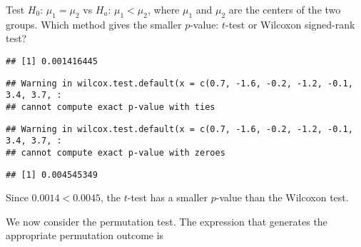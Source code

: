 \documentclass[
]{book}
\newenvironment{Shaded}{\begin{snugshade}}{\end{snugshade}}
\newcommand{\CommentTok}[1]{\textcolor[rgb]{0.56,0.35,0.01}{\textit{#1}}}
\newcommand{\DataTypeTok}[1]{\textcolor[rgb]{0.13,0.29,0.53}{#1}}
\newcommand{\KeywordTok}[1]{\textcolor[rgb]{0.13,0.29,0.53}{\textbf{#1}}}
\newcommand{\NormalTok}[1]{#1}
\newcommand{\OperatorTok}[1]{\textcolor[rgb]{0.81,0.36,0.00}{\textbf{#1}}}
\newcommand{\OtherTok}[1]{\textcolor[rgb]{0.56,0.35,0.01}{#1}}
\newcommand{\StringTok}[1]{\textcolor[rgb]{0.31,0.60,0.02}{#1}}
\begin{document}
Test \(H_0\): \(\mu_1 = \mu_2\) vs \(H_a\): \(\mu_1 < \mu_2\),
where \(\mu_1\) and \(\mu_2\) are the centers of the two groups.
Which method gives the smaller \(p\)-value:
\(t\)-test or Wilcoxon signed-rank test?

\begin{Shaded}
\end{Shaded}

\begin{verbatim}
## [1] 0.001416445
\end{verbatim}

\begin{Shaded}
\end{Shaded}

\begin{verbatim}
## Warning in wilcox.test.default(x = c(0.7, -1.6, -0.2, -1.2, -0.1, 3.4, 3.7, :
## cannot compute exact p-value with ties
\end{verbatim}

\begin{verbatim}
## Warning in wilcox.test.default(x = c(0.7, -1.6, -0.2, -1.2, -0.1, 3.4, 3.7, :
## cannot compute exact p-value with zeroes
\end{verbatim}

\begin{verbatim}
## [1] 0.004545349
\end{verbatim}

Since \(0.0014 < 0.0045\), the \(t\)-test has a smaller \(p\)-value than the Wilcoxon test.

We now consider the permutation test.
The expression that generates the appropriate permutation outcome is
\end{document}
